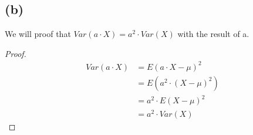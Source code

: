 \documentclass{article}
\begin{document}
\subsection*{(b)}
We will proof that $Var(a \cdot X) = a^{2} \cdot Var(X)$ with the result of a.
\begin{proof}
	\begin{align*}
		Var(a \cdot X) 
		&= E(a \cdot X - \mu)^{2} \\
		&= E(a^{2} \cdot (X - \mu)^{2} )\\
		&= a^{2} \cdot E(X - \mu)^{2} \\
		&= a^{2} \cdot Var(X)
	\end{align*}
\end{proof}




\end{document}

